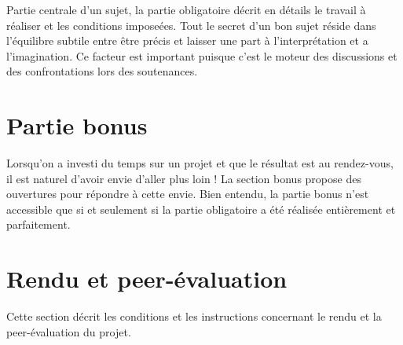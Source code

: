 \documentclass{42}
\begin{document}
    Partie centrale d'un sujet, la partie obligatoire d\'ecrit en
    d\'etails le travail \`a r\'ealiser et les conditions
    impose\'ees. Tout le secret d'un bon sujet r\'eside dans
    l'\'equilibre subtile entre \^etre pr\'ecis et laisser une part
    \`a l'interpr\'etation et a l'imagination. Ce facteur est
    important puisque c'est le moteur des discussions et des
    confrontations lors des soutenances.



\chapter{Partie bonus}

    Lorsqu'on a investi du temps sur un projet et que le r\'esultat
    est au rendez-vous, il est naturel d'avoir envie d'aller plus loin
    ! La section bonus propose des ouvertures pour r\'epondre \`a
    cette envie. Bien entendu, la partie bonus n'est accessible que si
    et seulement si la partie obligatoire a \'et\'e r\'ealis\'ee
    enti\`erement et parfaitement.


\chapter{Rendu et peer-\'evaluation}

    Cette section d\'ecrit les conditions et les instructions
    concernant le rendu et la peer-\'evaluation du projet.
\end{document}
